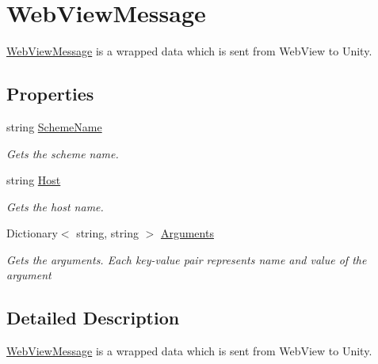 \hypertarget{class_voxel_busters_1_1_native_plugins_1_1_web_view_message}{}\section{Web\+View\+Message}
\label{class_voxel_busters_1_1_native_plugins_1_1_web_view_message}


\hyperlink{class_voxel_busters_1_1_native_plugins_1_1_web_view_message}{Web\+View\+Message} is a wrapped data which is sent from Web\+View to Unity.  


\subsection*{Properties}
\begin{DoxyCompactItemize}
\item 
string \hyperlink{class_voxel_busters_1_1_native_plugins_1_1_web_view_message_a81484dfa953b028480e92f49ae8b1680}{Scheme\+Name}
\begin{DoxyCompactList}\small\item\em Gets the scheme name. \end{DoxyCompactList}\item 
string \hyperlink{class_voxel_busters_1_1_native_plugins_1_1_web_view_message_abd5d02452d0753592d3ade6268727de8}{Host}
\begin{DoxyCompactList}\small\item\em Gets the host name. \end{DoxyCompactList}\item 
Dictionary$<$ string, string $>$ \hyperlink{class_voxel_busters_1_1_native_plugins_1_1_web_view_message_a77915caf0a62515434e69449dd74cb8a}{Arguments}
\begin{DoxyCompactList}\small\item\em Gets the arguments. Each key-\/value pair represents name and value of the argument \end{DoxyCompactList}\end{DoxyCompactItemize}


\subsection{Detailed Description}
\hyperlink{class_voxel_busters_1_1_native_plugins_1_1_web_view_message}{Web\+View\+Message} is a wrapped data which is sent from Web\+View to Unity. 



